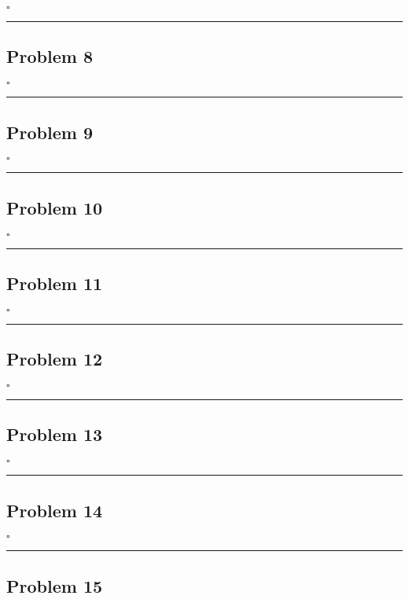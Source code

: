 \documentclass[12pt]{article}
\newcommand*{\QEDB}{\hfill\ensuremath{\square}}
\newcommand{\horrule}[1]{\rule{\linewidth}{#1}}
\begin{document}
\QEDB

\horrule{0.5pt}

\subsection*{Problem 8}

\QEDB

\horrule{0.5pt}

\subsection*{Problem 9}

\QEDB

\horrule{0.5pt}

\subsection*{Problem 10}

\QEDB

\horrule{0.5pt}

\subsection*{Problem 11}

\QEDB

\horrule{0.5pt}

\subsection*{Problem 12}

\QEDB

\horrule{0.5pt}

\subsection*{Problem 13}

\QEDB

\horrule{0.5pt}

\subsection*{Problem 14}

\QEDB

\horrule{0.5pt}

\subsection*{Problem 15}
\end{document}
